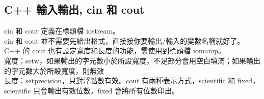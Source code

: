 \subsection{C++ 輸入輸出, cin 和 cout}
cin 和 cout 定義在標頭檔 iostream。\\
cin 和 cout 並不需要先給出格式，直接接你要輸出/輸入的變數名稱就好了。\\


C++ 的 cout 也有設定寬度和長度的功能，需使用到標頭檔 iomanip。\\
寬度：setw，如果輸出的字元數小於所設寬度，不足部分會用空白填滿；如果輸出的字元數大於所設寬度，則無效\\

長度：setprecision，只對浮點數有效。cout 有兩種表示方式，scientific 和 fixed，scientific 只會輸出有效位數，fixed 會將所有位數印出。\\

